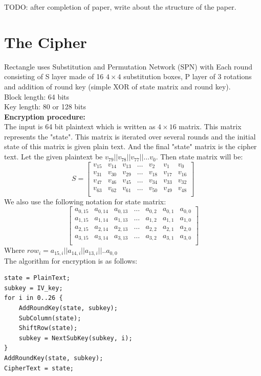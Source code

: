 \documentclass[final]{transcrypto}
\begin{document}
TODO: after completion of paper, write about the structure of the paper.
\section{The Cipher}
Rectangle uses Substitution and Permutation Network (SPN) with  Each round consisting of S layer made of 16 $4 \times 4$ substitution boxes, P layer of 3 rotations and addition of round key (simple XOR of state matrix and round key).\\
\newline
Block length: 64 bits\\
Key length: 80 or 128 bits\\
\newline
\textbf{Encryption procedure:}\\
The input is 64 bit plaintext which is written as $4\times 16$ matrix. This matrix represents the "state". This matrix is iterated over several rounds and the initial state of this matrix is given plain text. And the final "state" matrix is the cipher text. Let the given plaintext be $v_{79}||v_{78}||v_{77}||\dots v_{0}$. Then state matrix will be:
$$S=
\begin{bmatrix}
v_{15} & v_{14} & v_{13} & \dots & v_{2} & v_{1} & v_{0}\\
v_{31} & v_{30} & v_{29} & \dots & v_{18} & v_{17} & v_{16}\\
v_{47} & v_{46} & v_{45} & \dots & v_{34} & v_{33} & v_{32}\\
v_{63} & v_{62} & v_{61} & \dots & v_{50} & v_{49} & v_{48}\\
\end{bmatrix}
$$
We also use the following notation for state matrix:
$$
\begin{bmatrix}
a_{0,15} & a_{0,14} & a_{0,13} & \dots & a_{0,2} & a_{0,1} & a_{0,0}\\
a_{1,15} & a_{1,14} & a_{1,13} & \dots & a_{1,2} & a_{1,1} & a_{1,0}\\
a_{2,15} & a_{2,14} & a_{2,13} & \dots & a_{2,2} & a_{2,1} & a_{2,0}\\
a_{3,15} & a_{3,14} & a_{3,13} & \dots & a_{3,2} & a_{3,1} & a_{3,0}\\
\end{bmatrix}
$$
Where $row_{i} = a_{15,i}||a_{14,i}||a_{13,i}||..a_{0,0}$\\
The algorithm for encryption is as follows:
\begin{lstlisting}[float,floatplacement=H]
state = PlainText;
subkey = IV_key;
for i in 0..26 {
    AddRoundKey(state, subkey);
    SubColumn(state);
    ShiftRow(state);
    subkey = NextSubKey(subkey, i);
}
AddRoundKey(state, subkey);
CipherText = state; 
\end{lstlisting}\\
\end{document}

